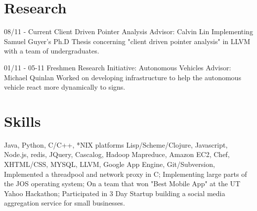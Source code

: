 \documentclass[11pt,letter,sans]{moderncv}
\begin{document}
\section{Research}
\cventry
{08/11 - Current}
{Client Driven Pointer Analysis}
{Advisor: Calvin Lin}
{}
{}
{Implementing Samuel Guyer's Ph.D Thesis concerning "client driven pointer
analysis" in LLVM with a team of undergraduates.}

\cventry
{01/11 - 05-11}
{Freshmen Research Initiative: Autonomous Vehicles}
{Advisor: Michael Quinlan}
{}
{}
{Worked on developing infrastructure to help the autonomous vehicle react more
dynamically to signs.} 

\section{Skills}
{Java, Python, C/C++, *NIX platforms}
{Lisp/Scheme/Clojure, Javascript, Node.js, redis, JQuery, Cascalog, Hadoop Mapreduce,
Amazon EC2, Chef, XHTML/CSS, MYSQL, LLVM, Google App Engine, Git/Subversion, }
{Implemented a threadpool and network proxy in C; Implementing large parts of
  the JOS operating system; On a team that won "Best Mobile App" at the UT
  Yahoo Hackathon; Participated in 3 Day Startup building a social media
aggregation service for small businesses.}
\end{document}
